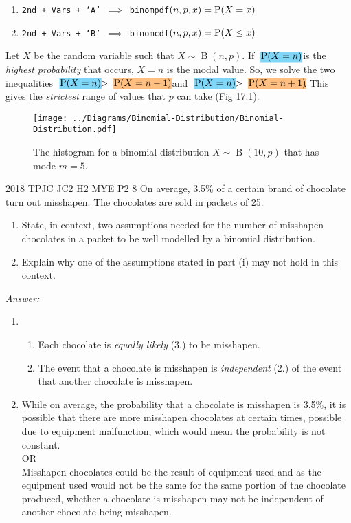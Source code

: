 \documentclass[oneside]{book}
\newcommand{\highlight}[2][red!50]{\mathpalette{\highlightwithstyle[#1]}{#2}}
\newcommand{\highlightwithstyle}[3][red!50]{
  \begingroup                         %
    \sbox0{$\mathsurround 0pt #2#3$}%
    \setlength{\fboxsep}{.5pt}        %
    \sbox2{\hspace{-.5pt}%
      \colorbox{#1}{\usebox0}%
    }%
    \dp2=\dp0 \ht2=\ht0 \wd2=\wd0     %
    \box2                             %
  \endgroup                           %
}
\begin{document}
\begin{GCSkills}{}
  \begin{enumerate}
    \item \texttt{2nd + Vars + `A' \(\implies\) binompdf\((n,p,x)=\operatorname{P}(X=x)\)}
    \item \texttt{2nd + Vars + `B' \(\implies\) binomcdf\((n,p,x)=\operatorname{P}(X\leq x)\)}
  \end{enumerate}
\end{GCSkills}
\begin{note}
  Let \(X\) be the random variable such that \(X \sim \operatorname{B}(n,p)\). If \(\highlight[cyan!50]{\Prob(X=n)}\) is the \emph{highest probability} that occurs, \(X=n\) is the modal value. So, we solve the two inequalities \(\highlight[cyan!50]{\Prob(X=n)}>\highlight[orange!50]{\Prob(X=n-1)}\) and \(\highlight[cyan!50]{\Prob(X=n)}>\highlight[orange!50]{\Prob(X=n+1)}\). This gives the \emph{strictest} range of values that \(p\) can take (Fig 17.1).
\end{note}
\begin{figure}[H]
  \centering
  \texttt{[image: ../Diagrams/Binomial-Distribution/Binomial-Distribution.pdf]}
  \caption{The histogram for a binomial distribution \(X\sim\operatorname{B}(10,p)\) that has mode \(m=5\).}
  \label{fig:binomial-distribution}
\end{figure}
\begin{example}{2018 TPJC JC2 H2 MYE P2 8}{}
  On average, 3.5\% of a certain brand of chocolate turn out misshapen. The chocolates are sold in packets of 25.
  \begin{enumerate}[label=(\roman*)]
    \item State, in context, two assumptions needed for the number of misshapen chocolates in a packet to be well modelled by a binomial distribution.
    \item Explain why one of the assumptions stated in part (i) may not hold in this context.
  \end{enumerate}
  \textit{Answer:}
  \begin{enumerate}[label=(\roman*)]
    \item 
    \begin{enumerate}[label=\arabic*.]
      \item Each chocolate is \emph{equally likely} (3.) to be misshapen.
      \item The event that a chocolate is misshapen is \emph{independent} (2.) of the event that another chocolate is misshapen.
    \end{enumerate}
    \item While on average, the probability that a chocolate is misshapen is 3.5\%, it is possible that there are more misshapen chocolates at certain times, possible due to equipment malfunction, which would mean the probability is not constant.\\[3mm]
    OR\\[3mm]
    Misshapen chocolates could be the result of equipment used and as the equipment used would not be the same for the same portion of the chocolate produced, whether a chocolate is misshapen may not be independent of another chocolate being misshapen.
  \end{enumerate}
\end{example}
\end{document}
